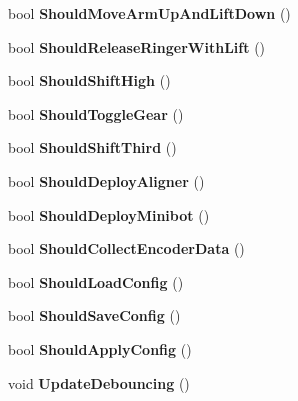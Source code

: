 \begin{DoxyCompactItemize}
\item 
\hypertarget{class_processed_inputs_ae035b36508edb3eb48a88446874bd366}{
bool {\bfseries \-Should\-Move\-Arm\-Up\-And\-Lift\-Down} ()}
\label{class_processed_inputs_ae035b36508edb3eb48a88446874bd366}

\item 
\hypertarget{class_processed_inputs_a775edd7d86056d5fc95ca44695a6aaef}{
bool {\bfseries \-Should\-Release\-Ringer\-With\-Lift} ()}
\label{class_processed_inputs_a775edd7d86056d5fc95ca44695a6aaef}

\item 
\hypertarget{class_processed_inputs_aba2a5888e05892b93b3c225589c29c6a}{
bool {\bfseries \-Should\-Shift\-High} ()}
\label{class_processed_inputs_aba2a5888e05892b93b3c225589c29c6a}

\item 
\hypertarget{class_processed_inputs_a3d8ae0238e293d05e5b392bdd44c29d2}{
bool {\bfseries \-Should\-Toggle\-Gear} ()}
\label{class_processed_inputs_a3d8ae0238e293d05e5b392bdd44c29d2}

\item 
\hypertarget{class_processed_inputs_a335b4d9e5d86b09391db4589cd4a3d99}{
bool {\bfseries \-Should\-Shift\-Third} ()}
\label{class_processed_inputs_a335b4d9e5d86b09391db4589cd4a3d99}

\item 
\hypertarget{class_processed_inputs_a885928275c07d7255b3c5cc85a46b398}{
bool {\bfseries \-Should\-Deploy\-Aligner} ()}
\label{class_processed_inputs_a885928275c07d7255b3c5cc85a46b398}

\item 
\hypertarget{class_processed_inputs_aa61aafb52f6ff4c09812e6676a0773c7}{
bool {\bfseries \-Should\-Deploy\-Minibot} ()}
\label{class_processed_inputs_aa61aafb52f6ff4c09812e6676a0773c7}

\item 
\hypertarget{class_processed_inputs_a448b0fa0ecdea671a06b310ea945cb69}{
bool {\bfseries \-Should\-Collect\-Encoder\-Data} ()}
\label{class_processed_inputs_a448b0fa0ecdea671a06b310ea945cb69}

\item 
\hypertarget{class_processed_inputs_a0f728588c247732b80151b23f26a8661}{
bool {\bfseries \-Should\-Load\-Config} ()}
\label{class_processed_inputs_a0f728588c247732b80151b23f26a8661}

\item 
\hypertarget{class_processed_inputs_ac8738507efed259815ba55871e543ef0}{
bool {\bfseries \-Should\-Save\-Config} ()}
\label{class_processed_inputs_ac8738507efed259815ba55871e543ef0}

\item 
\hypertarget{class_processed_inputs_a124403bfcf6d2a4c443bd8f8fb4d23d4}{
bool {\bfseries \-Should\-Apply\-Config} ()}
\label{class_processed_inputs_a124403bfcf6d2a4c443bd8f8fb4d23d4}

\item 
\hypertarget{class_processed_inputs_ae9c1b0c66a2590c1362b15f58e473a5c}{
void {\bfseries \-Update\-Debouncing} ()}
\label{class_processed_inputs_ae9c1b0c66a2590c1362b15f58e473a5c}

\end{DoxyCompactItemize}
